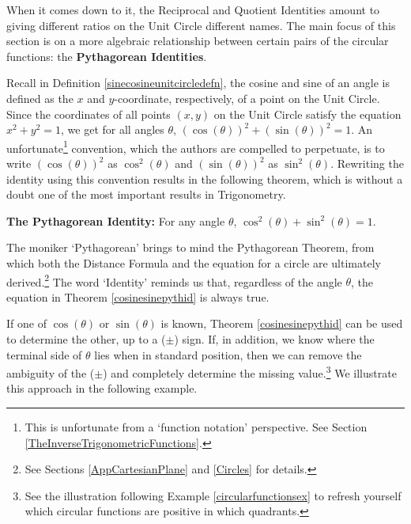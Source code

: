 \documentclass{ximera}
\begin{document}
\smallskip

When it comes down to it, the Reciprocal and Quotient Identities amount to giving different ratios on the Unit Circle different names.  The main focus of this section is on a more algebraic relationship between certain pairs of the circular functions: the \textbf{Pythagorean Identities}.

\smallskip

Recall in Definition \ref{sinecosineunitcircledefn}, the cosine and sine of an angle is defined as the $x$ and $y$-coordinate, respectively, of a point on the Unit Circle.  Since the coordinates of all points $(x,y)$ on the Unit Circle satisfy the equation $x^2+y^2 = 1$, we get for all angles $\theta$, $\left(\cos(\theta)\right)^2 + \left(\sin(\theta)\right)^2 = 1$.  An unfortunate\footnote{This is unfortunate from a `function notation' perspective. See Section \ref{TheInverseTrigonometricFunctions}.} convention, which the authors are compelled to perpetuate,  is to write $\left(\cos(\theta)\right)^2$ as $\cos^{2}(\theta)$ and $\left(\sin(\theta)\right)^2$ as $\sin^{2}(\theta)$. Rewriting the identity using this convention results in the following theorem, which is without a doubt one of the most important results in Trigonometry.

\smallskip


\begin{theorem} \label{cosinesinepythid} \textbf{The Pythagorean Identity:}  For any angle $\theta$, $\cos^{2}(\theta) + \sin^{2}(\theta) = 1$.

\end{theorem}


\smallskip

The moniker `Pythagorean' brings to mind the Pythagorean Theorem, from which both the Distance Formula and the equation for a circle are ultimately derived.\footnote{See Sections \ref{AppCartesianPlane} and \ref{Circles} for details.}  The word `Identity' reminds us that, regardless of the angle $\theta$, the equation in Theorem \ref{cosinesinepythid} is always true.  

\smallskip

If one of $\cos(\theta)$ or $\sin(\theta)$ is known, Theorem \ref{cosinesinepythid} can be used to determine the other, up to a ($\pm$) sign.  If, in addition, we know where the terminal side of $\theta$ lies when in standard position, then we can remove the ambiguity of the ($\pm$) and completely determine the missing value.\footnote{See the illustration following Example \ref{circularfunctionsex} to refresh yourself which circular functions are positive in which quadrants.}  We illustrate this approach in the following example.
\end{document}
